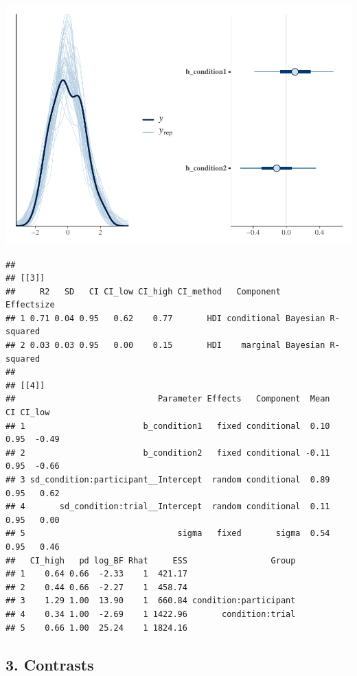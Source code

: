 \documentclass[
]{article}
\begin{document}
\includegraphics{08_Publish_GUSO_ASIL_files/figure-latex/DiagnosticsQ-4.pdf}

\begin{verbatim}
## 
## [[3]]
##     R2   SD   CI CI_low CI_high CI_method   Component         Effectsize
## 1 0.71 0.04 0.95   0.62    0.77       HDI conditional Bayesian R-squared
## 2 0.03 0.03 0.95   0.00    0.15       HDI    marginal Bayesian R-squared
## 
## [[4]]
##                             Parameter Effects   Component  Mean   CI CI_low
## 1                        b_condition1   fixed conditional  0.10 0.95  -0.49
## 2                        b_condition2   fixed conditional -0.11 0.95  -0.66
## 3 sd_condition:participant__Intercept  random conditional  0.89 0.95   0.62
## 4       sd_condition:trial__Intercept  random conditional  0.11 0.95   0.00
## 5                               sigma   fixed       sigma  0.54 0.95   0.46
##   CI_high   pd log_BF Rhat     ESS                 Group
## 1    0.64 0.66  -2.33    1  421.17                      
## 2    0.44 0.66  -2.27    1  458.74                      
## 3    1.29 1.00  13.90    1  660.84 condition:participant
## 4    0.34 1.00  -2.69    1 1422.96       condition:trial
## 5    0.66 1.00  25.24    1 1824.16
\end{verbatim}

\hypertarget{contrasts-1}{%
\subsection{3. Contrasts}\label{contrasts-1}}
\end{document}
